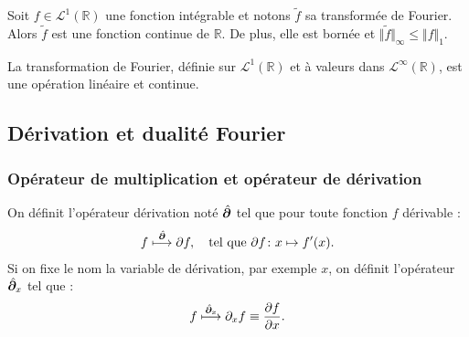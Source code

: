 \begin{Prop} Soit $f \in \mathcal L^1(\mathbb{R})$ une fonction intégrable et notons $\tilde f$ sa transformée de Fourier. Alors $\tilde f$ est une fonction continue de $\mathbb R $. De plus, elle est bornée et $\Vert \tilde f \Vert_\infty \leq \Vert f \Vert_1$. 
\end{Prop}  

\begin{Theo} La transformation de Fourier, définie sur $\mathcal L^1(\mathbb R)$ et à valeurs dans $\mathcal L^\infty(\mathbb R)$, est une opération linéaire et continue. 
\end{Theo}

\subsection{Dérivation et dualité Fourier}

\subsubsection{Opérateur de multiplication et opérateur de dérivation}



On définit l'opérateur
dérivation noté $\hat{\bm{\partial}}$ tel que pour toute fonction $f$ dérivable : 
\begin{eqnarray}
 f \overset{\hat{\bm{\partial}}}{\longmapsto} \partial f, \quad \mbox{tel que } \partial f \colon x \mapsto f'(x).
\end{eqnarray}
Si on fixe le nom la variable de dérivation, par exemple \guillemotleft{}$x$\guillemotright{}, on définit l'opérateur $\hat{\bm{\partial}}_x$ tel que :
\begin{eqnarray}
 f \overset{\hat{\bm{\partial}}_x}{\longmapsto} \partial_x f \equiv \frac{\partial f }{\partial x }.
\end{eqnarray}

